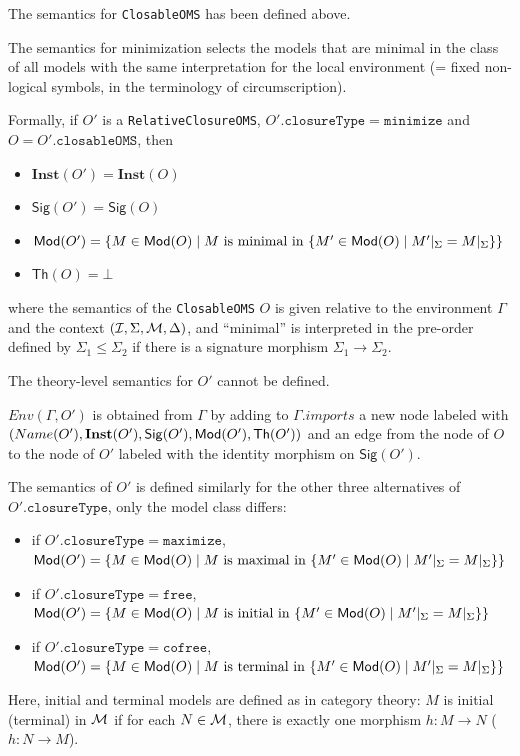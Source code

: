 \documentclass[10pt,fleqn,final]{scrreprt}
\newcommand*{\syntax}[1]{\texttt{#1}}
\newcommand{\Sig}{\mathsf{Sig}}
\renewcommand{\Th}{\mathsf{Th}}
\newcommand{\Inst}{\ensuremath{\mathbf{Inst}}}
\newcommand{\semdom}[1]{
\begin{center}
\fbox{$#1$}
\end{center}
}
\newenvironment{definitions}[0]{\medskip }{}
\begin{document}
\begin{definitions}
 
\semdom{sem(\Gamma, (\cI, \Sigma, \cM, \Delta), \syntax{ExtendingOMS})=
(\Gamma',(\cI,\Sigma',\cM', \Delta'))}

The semantics for \syntax{ClosableOMS} has been defined above.

The semantics for minimization selects the models that are minimal
in the class of all models with the same interpretation for the
local environment (= fixed non-logical symbols, in the terminology of circumscription).

Formally, if $O'$ is a \syntax{RelativeClosureOMS},
$O'.\syntax{closureType} = \syntax{minimize}$
and $O = O'.\syntax{closableOMS}$, then 
\begin{itemize}
 \item $\Inst(O')= \Inst(O)$
 \item $\Sig(O') = \Sig(O)$
 \item $\mathsf{Mod}(O') = 
        \{ M \in  \mathsf{Mod}(O) \mid  M \text{ is minimal in } \{M' \in \mathsf{Mod}(O) \mid M'|_{\Sigma} = M|_{\Sigma}\}\}$
 \item $\Th(O) = \bot$ 
\end{itemize}
\noindent where the semantics of the \syntax{ClosableOMS} $O$ is given relative to 
the environment
$\Gamma$ and the context $({\cal I}, \Sigma, {\cal M}, \Delta)$, and ``minimal''
is interpreted in the pre-order defined by $\Sigma_1\leq\Sigma_2$
if there is a signature morphism $\Sigma_1\to\Sigma_2$.

The theory-level semantics for $O'$ cannot be defined.

$Env(\Gamma, O')$ is obtained from $\Gamma$ by adding to $\Gamma.imports$ a new
node labeled with $(Name(O'), \Inst(O'),\allowbreak \Sig(O'), \Mod(O'), \Th(O'))$ and
an edge from the node of $O$ to the node of $O'$ labeled with the identity
morphism on $\Sig(O')$.


The semantics of $O'$
is defined similarly for the other three alternatives of $O'.\syntax{closureType}$, 
only the model class differs:
\begin{itemize}
\item if $O'.\syntax{closureType} = \syntax{maximize}$,
$\mathsf{Mod}(O') = 
        \{ M \in  \mathsf{Mod}(O) \mid  M \text{ is maximal in } \{M' \in \mathsf{Mod}(O) \mid M'|_{\Sigma} = M|_{\Sigma}\}\}$
\item if $O'.\syntax{closureType} = \syntax{free}$,
$\mathsf{Mod}(O') = 
        \{ M \in  \mathsf{Mod}(O) \mid  M \text{ is initial in } \{M' \in \mathsf{Mod}(O) \mid M'|_{\Sigma} = M|_{\Sigma}\}\}$
\item if $O'.\syntax{closureType} = \syntax{cofree}$,
$\mathsf{Mod}(O') = 
        \{ M \in  \mathsf{Mod}(O) \mid  M \text{ is terminal in } \{M' \in \mathsf{Mod}(O) \mid M'|_{\Sigma} = M|_{\Sigma}\}\}$
\end{itemize}
Here, initial and terminal models are defined as in
category theory: $M$ is initial (terminal) in ${\cal M}$ if for each 
$N\in{\cal M}$, there is exactly one morphism $h:M\to N$ ($h:N\to M$).


\end{definitions}
\end{document}
